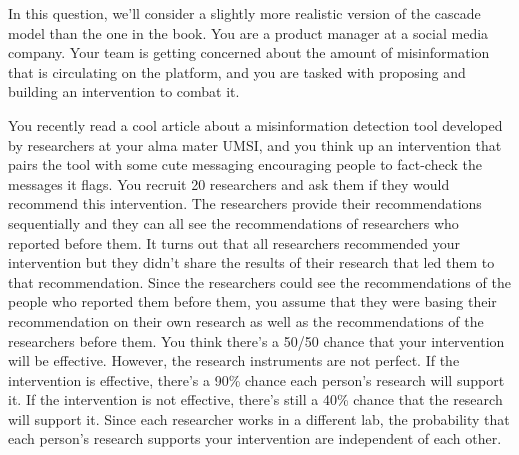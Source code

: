 \documentclass[newpages]{assignment}
\begin{document}
\begin{problem}
    In this question, we'll consider a slightly more realistic version of the cascade model than the one in the book. You are a product manager at a social media company. Your team is getting concerned about the amount of misinformation that is circulating on the platform, and you are tasked with proposing and building an intervention to combat it.

    You recently read a cool article about a misinformation detection tool developed by researchers at your alma mater UMSI, and you think up an intervention that pairs the tool with some cute messaging encouraging people to fact-check the messages it flags. You recruit 20 researchers and ask them if they would recommend this intervention. The researchers provide their recommendations sequentially and they can all see the recommendations of researchers who reported before them. It turns out that all researchers recommended your intervention but they didn't share the results of their research that led them to that recommendation. Since the researchers could see the recommendations of the people who reported them before them, you assume that they were basing their recommendation on their own research as well as the recommendations of the researchers before them. You think there's a 50/50 chance that your intervention will be effective. However, the research instruments are not perfect. If the intervention is effective, there's a 90\% chance each person's research will support it. If the intervention is not effective, there's still a 40\% chance that the research will support it. Since each researcher works in a different lab, the probability that each person’s research supports your intervention are independent of each other.
\end{problem}
\end{document}
